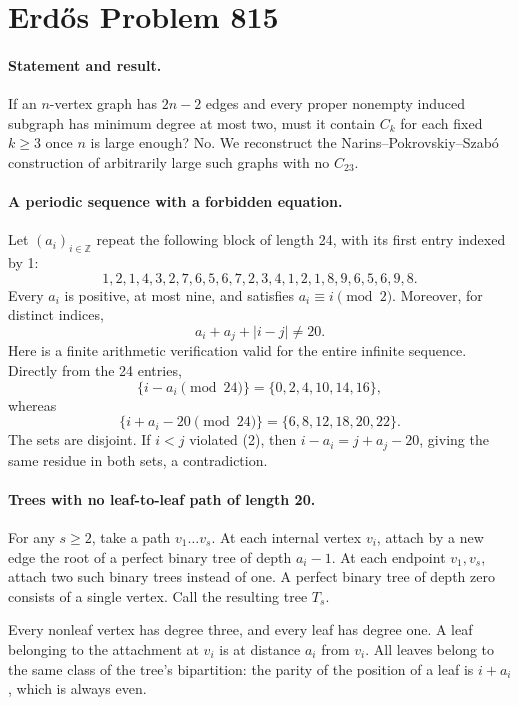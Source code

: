 \section*{Erd\H{o}s Problem 815}

\paragraph{Statement and result.}
If an \(n\)-vertex graph has \(2n-2\) edges and every proper nonempty induced subgraph has minimum degree at most two, must it contain \(C_k\) for each fixed \(k\geq3\) once \(n\) is large enough? No. We reconstruct the Narins--Pokrovskiy--Szab\'o construction of arbitrarily large such graphs with no \(C_{23}\).

\paragraph{A periodic sequence with a forbidden equation.}
Let \((a_i)_{i\in\mathbb Z}\) repeat the following block of length 24, with its first entry indexed by 1:
\[
 1,2,1,4,3,2,7,6,5,6,7,2,
 3,4,1,2,1,8,9,6,5,6,9,8.
\tag{1}
\]
Every \(a_i\) is positive, at most nine, and satisfies \(a_i\equiv i\pmod2\). Moreover, for distinct indices,
\[
 a_i+a_j+|i-j|\ne20.
\tag{2}
\]
Here is a finite arithmetic verification valid for the entire infinite sequence. Directly from the 24 entries,
\[
 \{i-a_i\pmod{24}\}=\{0,2,4,10,14,16\},
\]
whereas
\[
 \{i+a_i-20\pmod{24}\}=\{6,8,12,18,20,22\}.
\]
The sets are disjoint. If \(i<j\) violated (2), then \(i-a_i=j+a_j-20\), giving the same residue in both sets, a contradiction.

\paragraph{Trees with no leaf-to-leaf path of length 20.}
For any \(s\geq2\), take a path \(v_1\ldots v_s\). At each internal vertex \(v_i\), attach by a new edge the root of a perfect binary tree of depth \(a_i-1\). At each endpoint \(v_1,v_s\), attach two such binary trees instead of one. A perfect binary tree of depth zero consists of a single vertex. Call the resulting tree \(T_s\).

Every nonleaf vertex has degree three, and every leaf has degree one. A leaf belonging to the attachment at \(v_i\) is at distance \(a_i\) from \(v_i\). All leaves belong to the same class of the tree's bipartition: the parity of the position of a leaf is \(i+a_i\), which is always even.

